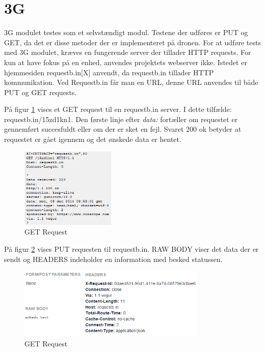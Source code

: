 \section{3G}

3G modulet testes som et selvstændigt modul. 
Testene der udføres er PUT og GET, da det er disse metoder der er implementeret på dronen. 
For at udføre tests med 3G modulet, kræves en fungerende server der tillader HTTP requests. For kun at have fokus på en enhed, anvendes projektets webserver ikke. Istedet er hjemmesiden requestb.in[X] anvendt, da requestb.in tillader HTTP kommunikation. Ved Requestb.in får man en URL, denne URL anvendes til både PUT og GET requests.

På figur \ref{fig:get_req} vises et GET request til en requestb.in server. I dette tilfælde: requestb.in/15zd1kn1. Den første linje efter \textit{data:} fortæller om requestet er gennemført succesfuldt eller om der er sket en fejl. Svaret 200 ok betyder at requestet er gået igennem og det ønskede data er hentet. 

\begin{figure}[H]
\centering
\includegraphics[width=0.4\textwidth]{Billeder/Test/get_requestbin.png}
\caption{GET Request}
\label{fig:get_req}
\end{figure}

På figur \ref{fig:put_req} vises PUT requesten til requestb.in. RAW BODY viser det data der er sendt og HEADERS indeholder en information med besked statussen.

\begin{figure}[H]
\centering
\includegraphics[width=0.8\textwidth]{Billeder/Test/put_request.png}
\caption{GET Request}
\label{fig:put_req}
\end{figure}
